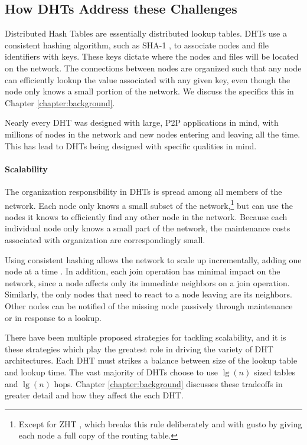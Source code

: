 \subsection{How DHTs Address these Challenges}
Distributed Hash Tables are essentially distributed lookup tables.
DHTs use a consistent hashing algorithm, such as SHA-1 \cite{sha1}, to associate nodes and file identifiers with keys.  
These keys dictate where the nodes and files will be located on the network.
The connections between nodes are organized such that any node can efficiently lookup the value associated with any given key, even though the node only knows a small portion of the network.
We discuss the specifics this in Chapter \ref{chapter:background}.

Nearly every DHT was designed with large, P2P applications in mind, with millions of nodes in the network and new nodes entering and leaving all the time.
This has lead to DHTs being designed with specific qualities in mind.

\paragraph{Scalability}
The organization responsibility in DHTs is spread among all members of the network.
Each node only knows a small subset of the network,\footnote{Except for ZHT \cite{li2013zht}, which breaks this rule deliberately and with gusto by giving each node a full copy of the routing table.} but can use the nodes it knows to efficiently find any other node in the network.
Because each individual node only knows a small part of the network, the maintenance costs associated with organization are correspondingly small.

Using consistent hashing allows the network to scale up incrementally, adding one node at a time \cite{dynamo}.
In addition, each join operation has minimal impact on the network, since a node affects only its immediate neighbors on a join operation.
Similarly, the only nodes that need to react to a node leaving are its neighbors.
Other nodes can be notified of the missing node passively through maintenance or in response to a lookup.

There have been multiple proposed strategies for tackling scalability, and it is these strategies which play the greatest role in driving the variety of DHT architectures. 
Each DHT must strikes a balance between size of the lookup table and lookup time. 
The vast majority of DHTs choose to use $\lg(n)$ sized tables and  $\lg(n)$ hops. 
Chapter \ref{chapter:background} discusses these tradeoffs in greater detail and how they affect the each DHT.


